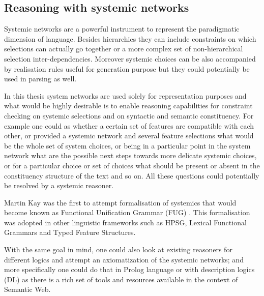 
\subsection{Reasoning with systemic networks}
    Systemic networks are a powerful instrument to represent the paradigmatic dimension of language. Besides hierarchies they can include constraints on which selections can actually go together or a more complex set of non-hierarchical selection inter-dependencies. Moreover systemic choices can be also accompanied by realisation rules useful for generation purpose but they could potentially be used in parsing as well. 

    In this thesis system networks are used solely for representation purposes and what would be highly desirable is to enable reasoning capabilities for constraint checking on systemic selections and on syntactic and semantic constituency. For example one could as whether a certain set of features are compatible with each other, or provided a systemic network and several feature selections what would be the whole set of system choices, or being in a particular point in the system network what are the possible next steps towards more delicate systemic choices, or for a particular choice or set of choices what should be present or absent in the constituency structure of the text and so on. All these questions could potentially be resolved by a systemic reasoner. 

    Martin Kay was the first to attempt formalisation of systemics that would become known as Functional Unification Grammar (FUG) \citep{Kay1985}. This formalisation was adopted in other linguistic frameworks such as HPSG, Lexical Functional Grammars and Typed Feature Structures. %

    With the same goal in mind, one could also look at existing reasoners for different logics and attempt an axiomatization of the systemic networks; and more specifically one could do that in Prolog language or with description logics (DL) as there is a rich set of tools and resources available in the context of Semantic Web.

